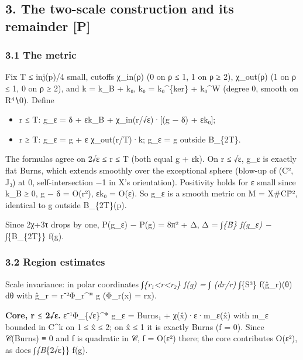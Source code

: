 \documentclass[
  10pt,
]{report}
\providecommand{\tightlist}{%
  \setlength{\itemsep}{0pt}\setlength{\parskip}{0pt}}
\begin{document}
\hypertarget{the-two-scale-construction-and-its-remainder-p}{%
\subsection{3. The two-scale construction and its remainder
{[}P{]}}\label{the-two-scale-construction-and-its-remainder-p}}

\hypertarget{the-metric}{%
\subsubsection{3.1 The metric}\label{the-metric}}

Fix T ≤ inj(p)/4 small, cutoffs χ\_in(ρ) (0 on ρ ≤ 1, 1 on ρ ≥ 2),
χ\_out(ρ) (1 on ρ ≤ 1, 0 on ρ ≥ 2), and k = k\_B + k₀, k₀ =
k₀\^{}\{ker\} + k₀\^{}W (degree 0, smooth on R⁴∖0). Define

\begin{itemize}
\tightlist
\item
  r ≤ T: g\_ε = δ + εk\_B + χ\_in(r/√ε)·{[}(g − δ) + εk₀{]};
\item
  r ≥ T: g\_ε = g + ε χ\_out(r/T)·k; g\_ε = g outside B\_\{2T\}.
\end{itemize}

The formulas agree on 2√ε ≤ r ≤ T (both equal g + εk). On r ≤ √ε, g\_ε
is exactly flat Burns, which extends smoothly over the exceptional
sphere (blow-up of (C², J₃) at 0, self-intersection −1 in X's
orientation). Positivity holds for ε small since k\_B ≥ 0, g − δ =
O(r²), εk₀ = O(ε). So g\_ε is a smooth metric on M = X\#CP̄², identical
to g outside B\_\{2T\}(p).

Since 2χ+3τ drops by one, P(g\_ε) − P(g) = 8π² + Δ, Δ = ∫\emph{\{B̃\}
f(g\_ε) − ∫}\{B\_\{2T\}\} f(g).

\hypertarget{region-estimates}{%
\subsubsection{3.2 Region estimates}\label{region-estimates}}

Scale invariance: in polar coordinates
∫\emph{\{r₁\textless r\textless r₂\} f(g) = ∫ (dr/r) ∫}\{S³\} f(ĝ\_r)(θ)
dθ with ĝ\_r = r⁻²Φ\_r\^{}* g (Φ\_r(x) = rx).

\textbf{Core, r ≤ 2√ε.} ε⁻¹Φ\_\{√ε\}\^{}* g\_ε = Burns₁ +
χ(\textbar x̂\textbar)·ε·m\_ε(x̂) with m\_ε bounded in C\^{}k on 1 ≤
\textbar x̂\textbar{} ≤ 2; on \textbar x̂\textbar{} ≤ 1 it is exactly
Burns (f = 0). Since 𝒞(Burns) ≡ 0 and f is quadratic in 𝒞, f = O(ε²)
there; the core contributes O(ε²), as does ∫\emph{\{B}\{2√ε\}\} f(g).
\end{document}
